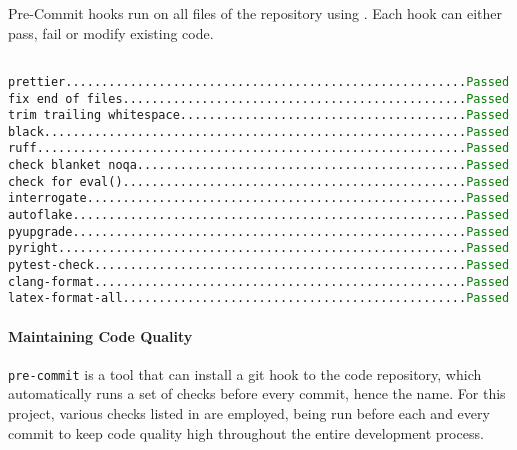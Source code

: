 \begin{table}[H]
  \centering
  \caption{Pre-Commit hooks run on all files of the repository using . Each hook can either pass, fail or modify existing code.}
  \texttt{
    \hspace*{-1em} prettier........................................................\textcolor{green}{Passed} \\
    fix end of files................................................\textcolor{green}{Passed} \\
    trim trailing whitespace........................................\textcolor{green}{Passed} \\
    black...........................................................\textcolor{green}{Passed} \\
    ruff............................................................\textcolor{green}{Passed} \\
    check blanket noqa..............................................\textcolor{green}{Passed} \\
    check for eval()................................................\textcolor{green}{Passed} \\
    interrogate.....................................................\textcolor{green}{Passed} \\
    autoflake.......................................................\textcolor{green}{Passed} \\
    pyupgrade.......................................................\textcolor{green}{Passed} \\
    pyright.........................................................\textcolor{green}{Passed} \\
    pytest-check....................................................\textcolor{green}{Passed} \\
    clang-format....................................................\textcolor{green}{Passed} \\
    latex-format-all................................................\textcolor{green}{Passed}
  }
  \label{table:pre-commit}
\end{table}

\paragraph{Maintaining Code Quality}
\texttt{pre-commit} is a tool that can install a git hook to the code repository, which automatically runs a set of checks before every commit, hence the name.
For this project, various checks listed in  are employed, being run before each and every commit to keep code quality high throughout the entire development process.

